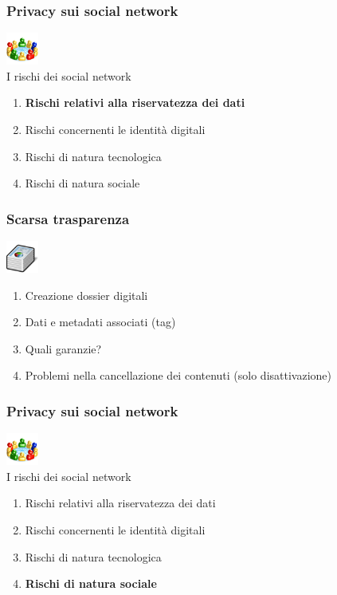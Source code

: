 \documentclass[xcolor=svgnames,handout]{beamer}
\begin{document}
\begin{frame}
	\frametitle{Privacy sui social network}

	\begin{block}{\includegraphics[width=40px]{img/social.png} \\ I rischi dei social network}
			\begin{enumerate}
					\item {\bf Rischi relativi alla riservatezza dei dati}
					\item Rischi concernenti le identità digitali
					\item Rischi di natura tecnologica
					\item Rischi di natura sociale
			\end{enumerate}
	\end{block}
\end{frame}

\begin{frame}
	\frametitle{Scarsa trasparenza}

	\begin{block}{\includegraphics[width=40px]{img/data.png}}
			\begin{enumerate}
					\item Creazione dossier digitali
						\pause
					\item Dati e metadati associati (tag)
						\pause
					\item Quali garanzie?
						\pause
					\item Problemi nella cancellazione dei contenuti (solo disattivazione)
			\end{enumerate}
	\end{block}
\end{frame}

\begin{frame}
	\frametitle{Privacy sui social network}

	\begin{block}{\includegraphics[width=40px]{img/social.png} \\ I rischi dei social network}
			\begin{enumerate}
					\item Rischi relativi alla riservatezza dei dati
					\item Rischi concernenti le identità digitali
					\item Rischi di natura tecnologica
					\item {\bf Rischi di natura sociale}
			\end{enumerate}
	\end{block}
\end{frame}
\end{document}
